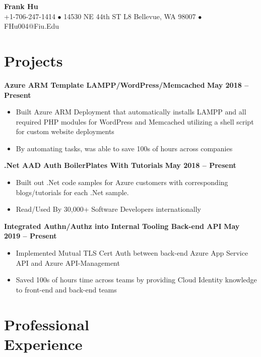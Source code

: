 \documentclass[margin,line]{resume}
\begin{document}
	{\centering \LARGE{\textbf{Frank Hu}}}
	\\
	\normalsize
	+1-706-247-1414 $\bullet$ 14530 NE 44th ST L8 Bellevue, WA 98007 $\bullet$ FHu004@Fiu.Edu
	
	\begin{resume}	
		
	
	\section{\mysidestyle Projects}
	
	\textbf{Azure ARM Template LAMPP/WordPress/Memcached}  \hfill \textbf{May 2018 -- Present}
	\vspace{1mm}
	\begin{itemize}
		\item Built Azure ARM Deployment that automatically installs LAMPP and all required PHP modules for WordPress and Memcached utilizing a shell script for custom website deployments
		\item By automating tasks, was able to save 100s of hours across companies
	\end{itemize}

	\textbf{.Net AAD Auth BoilerPlates With Tutorials}  \hfill \textbf{May 2018 -- Present}
	\vspace{1mm}
	\begin{itemize}
		\item Built out .Net code samples for Azure customers with corresponding blogs/tutorials for each .Net sample.
		\item Read/Used By 30,000+ Software Developers internationally
	\end{itemize}
	
	\textbf{Integrated Authn/Authz into Internal Tooling Back-end API}  \hfill \textbf{May 2019 -- Present}
	\vspace{1mm}
	\begin{itemize}
		\item Implemented Mutual TLS Cert Auth between back-end Azure App Service API and Azure API-Management 
		\item Saved 100s of hours time across teams by providing Cloud Identity knowledge to front-end and back-end teams
	\end{itemize}
		
	\section{\mysidestyle Professional\\Experience}
	

\end{resume}
\end{document}
